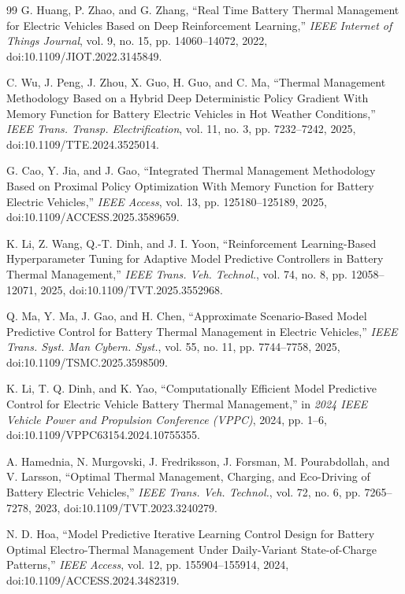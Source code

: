 \documentclass[twocolumn]{article}
\begin{document}
\begin{thebibliography}{99}
G. Huang, P. Zhao, and G. Zhang, ``Real Time Battery Thermal Management for Electric Vehicles Based on Deep Reinforcement Learning,'' \textit{IEEE Internet of Things Journal}, vol. 9, no. 15, pp. 14060--14072, 2022, doi:10.1109/JIOT.2022.3145849.

C. Wu, J. Peng, J. Zhou, X. Guo, H. Guo, and C. Ma, ``Thermal Management Methodology Based on a Hybrid Deep Deterministic Policy Gradient With Memory Function for Battery Electric Vehicles in Hot Weather Conditions,'' \textit{IEEE Trans. Transp. Electrification}, vol. 11, no. 3, pp. 7232--7242, 2025, doi:10.1109/TTE.2024.3525014.

G. Cao, Y. Jia, and J. Gao, ``Integrated Thermal Management Methodology Based on Proximal Policy Optimization With Memory Function for Battery Electric Vehicles,'' \textit{IEEE Access}, vol. 13, pp. 125180--125189, 2025, doi:10.1109/ACCESS.2025.3589659.

K. Li, Z. Wang, Q.-T. Dinh, and J. I. Yoon, ``Reinforcement Learning-Based Hyperparameter Tuning for Adaptive Model Predictive Controllers in Battery Thermal Management,'' \textit{IEEE Trans. Veh. Technol.}, vol. 74, no. 8, pp. 12058--12071, 2025, doi:10.1109/TVT.2025.3552968.

Q. Ma, Y. Ma, J. Gao, and H. Chen, ``Approximate Scenario-Based Model Predictive Control for Battery Thermal Management in Electric Vehicles,'' \textit{IEEE Trans. Syst. Man Cybern. Syst.}, vol. 55, no. 11, pp. 7744--7758, 2025, doi:10.1109/TSMC.2025.3598509.

K. Li, T. Q. Dinh, and K. Yao, ``Computationally Efficient Model Predictive Control for Electric Vehicle Battery Thermal Management,'' in \textit{2024 IEEE Vehicle Power and Propulsion Conference (VPPC)}, 2024, pp. 1--6, doi:10.1109/VPPC63154.2024.10755355.

A. Hamednia, N. Murgovski, J. Fredriksson, J. Forsman, M. Pourabdollah, and V. Larsson, ``Optimal Thermal Management, Charging, and Eco-Driving of Battery Electric Vehicles,'' \textit{IEEE Trans. Veh. Technol.}, vol. 72, no. 6, pp. 7265--7278, 2023, doi:10.1109/TVT.2023.3240279.

N. D. Hoa, ``Model Predictive Iterative Learning Control Design for Battery Optimal Electro-Thermal Management Under Daily-Variant State-of-Charge Patterns,'' \textit{IEEE Access}, vol. 12, pp. 155904--155914, 2024, doi:10.1109/ACCESS.2024.3482319.


\end{thebibliography}
\end{document}
